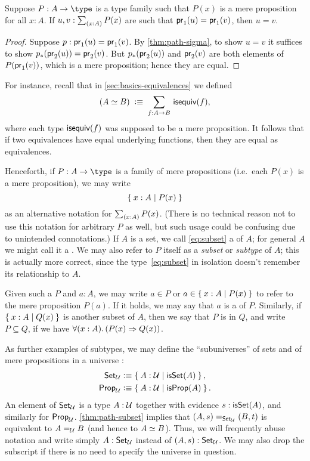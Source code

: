 \begin{lem}\label{thm:path-subset}
  Suppose $P:A\to\type$ is a type family such that $P(x)$ is a mere proposition for all $x:A$.
  If $u,v:\sm{x:A} P(x)$ are such that $\proj1(u) = \proj1(v)$, then $u=v$.
\end{lem}
\begin{proof}
  Suppose $p:\proj1(u) = \proj1(v)$.
  By \autoref{thm:path-sigma}, to show $u=v$ it suffices to show $\trans{p}{\proj2(u)} = \proj2(v)$.
  But $\trans{p}{\proj2(u)}$ and $\proj2(v)$ are both elements of $P(\proj1(v))$, which is a mere proposition; hence they are equal.
\end{proof}

For instance, recall that in \autoref{sec:basics-equivalences} we defined
\[(\eqv A B) \;\defeq\; \sm{f:A\to B} \isequiv (f),\]
where each type $\isequiv (f)$ was supposed to be a mere proposition.
It follows that if two equivalences have equal underlying functions, then they are equal as equivalences.

\label{defn:setof}%
Henceforth, if $P:A\to \type$ is a family of mere propositions (i.e.\ each $P(x)$ is a mere proposition), we may write
%
\begin{equation}
  \label{eq:subset}
  \setof{x:A | P(x)}
\end{equation}
%
as an alternative notation for $\sm{x:A} P(x)$.
(There is no technical reason not to use this notation for arbitrary $P$ as well, but such usage could be confusing due to unintended connotations.)
If $A$ is a set, we call \eqref{eq:subset} a 
%
%
of $A$; for general $A$ we might call it a .
%
We may also refer to $P$ itself as a \emph{subset} or \emph{subtype} of $A$; this is actually more correct, since the type~\eqref{eq:subset} in isolation doesn't remember its relationship to $A$.

Given such a $P$ and $a:A$, we may write $a\in P$ or $a\in \setof{x:A | P(x)}$ to refer to the mere proposition $P(a)$.
If it holds, we may say that $a$ is a  of $P$.
Similarly, if $\setof{x:A | Q(x)}$ is another subset of $A$, then we say that $P$ is 
%
%
in $Q$, and write $P\subseteq Q$, if we have $\fall{x:A}(P(x)\Rightarrow Q(x))$.

As further examples of subtypes, we may define the ``subuniverses'' of sets and of mere propositions in a universe \UU:
\begin{align*}
  \setU &\defeq \setof{A:\UU | \isset(A) },\\
  \propU &\defeq \setof{A:\UU | \isprop(A) }.
\end{align*}
An element of $\setU$ is a type $A:\UU$ together with evidence $s:\isset(A)$, and similarly for $\propU$.
\autoref{thm:path-subset} implies that $\id[\setU]{(A,s)}{(B,t)}$ is equivalent to $\id[\UU]AB$ (and hence to $\eqv AB$).
Thus, we will frequently abuse notation and write simply $A:\setU$ instead of $(A,s):\setU$.
We may also drop the subscript \UU if there is no need to specify the universe in question.

